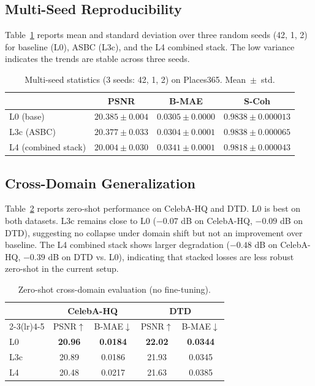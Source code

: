 \documentclass[10pt,conference]{IEEEtran}
\begin{document}
\subsection{Multi-Seed Reproducibility}
\label{sec:multiseed}

Table~\ref{tab:seeds} reports mean and standard deviation over three random
seeds (42, 1, 2) for baseline (L0), ASBC (L3c), and the L4 combined stack.
The low variance indicates the trends are stable across three seeds.

\begin{table}[t]
  \centering
  \caption{Multi-seed statistics (3 seeds: 42, 1, 2) on Places365. Mean~$\pm$~std.}
  \label{tab:seeds}
  \setlength{\tabcolsep}{5pt}
  \begin{tabular}{lccc}
    \toprule
    & \textbf{PSNR} & \textbf{B-MAE} & \textbf{S-Coh} \\
    \midrule
    L0 (base)    & $20.385 \pm 0.004$ & $0.0305 \pm 0.0000$ & $0.9838 \pm 0.000013$ \\
    L3c (ASBC)   & $20.377 \pm 0.033$ & $0.0304 \pm 0.0001$ & $0.9838 \pm 0.000065$ \\
    L4 (combined stack) & $20.004 \pm 0.030$ & $0.0341 \pm 0.0001$ & $0.9818 \pm 0.000043$ \\
    \bottomrule
  \end{tabular}
\end{table}

\subsection{Cross-Domain Generalization}
\label{sec:crossdomain}

Table~\ref{tab:crossdomain} reports zero-shot performance on CelebA-HQ and
DTD. L0 is best on both datasets. L3c remains close to L0
($-0.07$ dB on CelebA-HQ, $-0.09$ dB on DTD), suggesting no collapse under
domain shift but not an improvement over baseline. The L4 combined stack
shows larger degradation ($-0.48$ dB on CelebA-HQ, $-0.39$ dB on DTD vs. L0),
indicating that stacked losses are less robust zero-shot in the current setup.

\begin{table}[t]
  \centering
  \caption{Zero-shot cross-domain evaluation (no fine-tuning).}
  \label{tab:crossdomain}
  \setlength{\tabcolsep}{4.5pt}
  \begin{tabular}{lcccc}
    \toprule
    & \multicolumn{2}{c}{\textbf{CelebA-HQ}} & \multicolumn{2}{c}{\textbf{DTD}} \\
    \cmidrule(lr){2-3}\cmidrule(lr){4-5}
    & PSNR$\uparrow$ & B-MAE$\downarrow$ & PSNR$\uparrow$ & B-MAE$\downarrow$ \\
    \midrule
    L0  & \textbf{20.96} & \textbf{0.0184} & \textbf{22.02} & \textbf{0.0344} \\
    L3c & 20.89 & 0.0186 & 21.93 & 0.0345 \\
    L4  & 20.48 & 0.0217 & 21.63 & 0.0385 \\
    \bottomrule
  \end{tabular}
\end{table}
\end{document}
